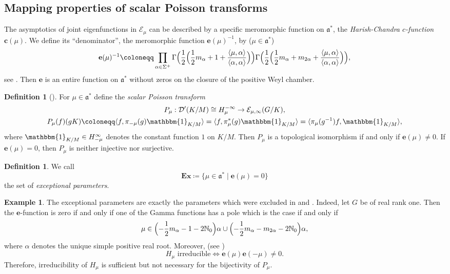 \documentclass[JEP,XML,SOM,NoFloatCountersInSection,Unicode,published]{cedram}
\theoremstyle{definition}
\newtheorem{definition}[theorem]{Definition}
\newtheorem{example}[theorem]{Example}
\newcommand{\mc}[1]{\ensuremath{\mathcal{#1}}}
\newcommand{\mf}[1]{\ensuremath{\mathfrak{#1}}}
\newcommand{\N}{\ensuremath{\mathbb{N}}}
\newcommand{\pst}[1]{\ensuremath{H_{#1}}}
\newcommand{\psts}[1]{\ensuremath{H_{#1}^\infty}}
\newcommand{\pstd}[1]{\ensuremath{H_{#1}^{-\infty}}}
\begin{document}
\subsection{Mapping properties of scalar Poisson transforms}
The asymptotics of joint eigenfunctions in $\mc E_\mu$ can be described by a specific meromorphic function on $\mf a^*$, the \emph{Harish-Chandra $c$-function} $\mathbf{c}(\mu)$. We define its ``denominator'', the meromorphic function $\mathbf{e}(\mu)^{-1}$, by ($\mu\in\mf a^*$)\vspace*{-3pt}
\[
\mathbf{e}(\mu)^{-1}\coloneqq\prod_{\alpha\in\Sigma^+}\Gamma\Bigl(\frac{1}{2}\Bigl(\frac{1}{2}m_\alpha+1+\frac{\langle\mu,\alpha\rangle}{\langle\alpha,\alpha\rangle}\Bigr)\Bigr)\Gamma\Bigl(\frac{1}{2}\Bigl(\frac{1}{2}m_\alpha+m_{2\alpha}+\frac{\langle\mu,\alpha\rangle}{\langle\alpha,\alpha\rangle}\Bigr)\Bigr),
\]
see \eg \cite[Eq.\,(5.17)]{Sc84}. Then $\mathbf{e}$ is an entire function on $\mf a^*$ without zeros on the closure of the positive Weyl chamber.
\begin{definition}[{\cf \cite[Th.\,10.6, 12.2]{vdBS87}}]\label{def:sc_PT}
For $\mu\in\mf a^*$ define the \emph{scalar Poisson transform}\vspace*{-5pt}
\begin{gather*}
P_\mu:\mc D'(K/M)\cong\pstd{\mu}\to\mc E_{\mu,\infty}(G/K),\\
P_\mu(f)(gK)\coloneqq\langle f,\pi_{-\mu}(g)\mathbbm{1}_{K/M}\rangle=\langle f,\pi_{\mu}^*(g)\mathbbm{1}_{K/M}\rangle=\langle\pi_{\mu}(g^{-1})f,\mathbbm{1}_{K/M}\rangle,
\end{gather*}
where $\mathbbm{1}_{K/M}\in\psts{-\mu}$ denotes the constant function $1$ on $K/M$. Then $P_\mu$ is a topological isomorphism if and only if $\mathbf{e}(\mu)\neq 0$. If $\mathbf{e}(\mu)=0$, then $P_\mu$ is neither injective nor surjective.
\end{definition}

\begin{definition}
We call\vspace*{-5pt}
\[
\mathbf{Ex}\coloneqq\{\mu\in\mf a^*\mid \mathbf{e}(\mu)=0\}
\]
the set of \emph{exceptional parameters}.
\end{definition}

\begin{example}\label{ex:Ex_rank_one}
The exceptional parameters are exactly the parameters which were excluded in \cite{DFG} and \cite{GHWb}. Indeed, let $G$ be of real rank one. Then the $\mathbf{e}$\nobreakdash-function is zero if and only if one of the Gamma functions has a pole which is the case if and only if\vspace*{-5pt}
\[
\mu\in\Bigl(-\frac{1}{2}m_\alpha-1-2\N_0 \Bigr)\alpha\cup \Bigl(-\frac{1}{2}m_\alpha-m_{2\alpha}-2\N_0 \Bigr)\alpha,
\]
where $\alpha$ denotes the unique simple positive real root. Moreover, (see \cite[Ch.\,IV, Th.\,1.1]{Hel70})\vspace*{-5pt}
\[
\pst{\mu}\text{ irreducible}\iff\mathbf{e}(\mu)\mathbf{e}(-\mu)\neq0.
\]
Therefore, irreducibility of $\pst{\mu}$ is sufficient but not necessary for the bijectivity of $P_\mu$.
\end{example}
\end{document}
